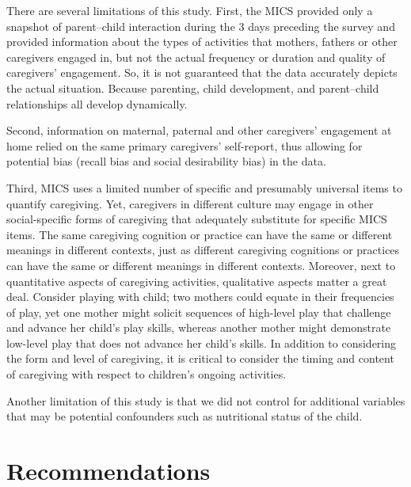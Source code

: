 \documentclass[
  12pt,
  oneside]{report}
\begin{document}
There are several limitations of this study. First, the MICS provided only a snapshot
of parent--child interaction during the 3 days preceding the survey and provided information about the types of activities that mothers, fathers or other caregivers engaged in, but not the actual frequency or duration and quality of caregivers' engagement. So, it is not guaranteed that the data accurately depicts the actual situation. Because parenting, child development, and parent--child relationships all develop dynamically.

Second, information on maternal, paternal and other caregivers' engagement at home relied on the same primary caregivers' self-report, thus allowing for potential bias (recall bias and social desirability bias) in the data.

Third, MICS uses a limited number of specific and presumably universal items to quantify caregiving. Yet, caregivers in different culture may engage in other social-specific forms of caregiving that adequately substitute for specific MICS items. The same caregiving cognition or practice can have the same or different meanings in different contexts, just as different caregiving cognitions or practices can have the same or different meanings in different contexts. Moreover, next to quantitative aspects of caregiving activities, qualitative aspects matter a great deal. Consider playing with child; two mothers could equate in their frequencies
of play, yet one mother might solicit sequences of high-level play that challenge and advance her child's play skills, whereas another mother might demonstrate low-level play that does not advance her child's skills. In addition to considering the
form and level of caregiving, it is critical to consider the timing and content of caregiving with respect to children's ongoing activities.

Another limitation of this study is that we did not control for additional variables that may be potential confounders such as nutritional status of the child.

\hypertarget{recommendations}{%
\section{Recommendations}\label{recommendations}}
\end{document}
